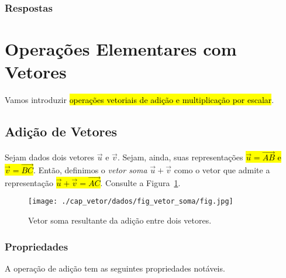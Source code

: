 \ifisbook
\subsubsection{Respostas}
\shipoutAnswer
\fi


\section{Operações Elementares com Vetores}\label{cap_vetor_sec_op}

Vamos introduzir \hl{operações vetoriais de adição e multiplicação por escalar}.

\subsection{Adição de Vetores}

Sejam dados dois vetores $\vec{u}$ e $\vec{v}$. Sejam, ainda, suas representações \hl{$\vec{u} = \overrightarrow{AB}$ e $\vec{v} = \overrightarrow{BC}$}. Então, definimos o \emph{vetor soma} $\vec{u}+\vec{v}$ como o vetor que admite a representação \hl{$\vec{u}+\vec{v} = \overrightarrow{AC}$}. Consulte a Figura~\ref{cap_vetor_sec_op:fig:vetor_soma}.

\begin{figure}[h]
  \centering
  \texttt{[image: ./cap\_vetor/dados/fig\_vetor\_soma/fig.jpg]}
  \caption{Vetor soma resultante da adição entre dois vetores.}
  \label{cap_vetor_sec_op:fig:vetor_soma}
\end{figure}

\subsubsection{Propriedades}

A operação de adição tem as seguintes propriedades notáveis.


